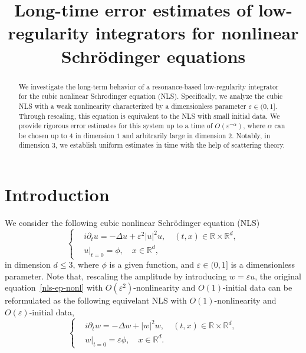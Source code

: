 \documentclass[10pt,a4paper]{article}
\title{Long-time error estimates of low-regularity integrators for nonlinear
Schr\"odinger equations}
\date{}
\begin{document}
  \maketitle
  \begin{abstract}
    We investigate the long-term behavior of a resonance-based low-regularity 
    integrator for the cubic nonlinear Schrodinger equation (NLS). Specifically, 
    we analyze the cubic NLS with a weak nonlinearity characterized by a 
    dimensionless parameter \(\varepsilon \in (0,1]\). Through rescaling, this 
    equation is equivalent to the NLS with small initial data. We provide rigorous
    error estimates for this system up to a time of \(O(\varepsilon^{-\alpha})\), 
    where \(\alpha\) can be chosen up to \(4\) in dimension \(1\) and arbitrarily 
    large in dimension \(2\). Notably, in dimension \(3\), we establish uniform 
    estimates in time with the help of scattering theory.
  \end{abstract}

  \section{Introduction}
  We consider the following cubic nonlinear Schr\"{o}dinger equation (NLS)
  \begin{equation}\label{nls-ep-nonl} %
    \left\{
    \begin{aligned}
      & i\partial_t u = -\Delta u + \varepsilon^2 |u|^2 u, \quad (t,x) \in
      \mathbb R\times\mathbb R^d, \\
      & u|_{t=0} = \phi, \quad x \in \mathbb R^d,
    \end{aligned}
    \right.
  \end{equation}
  in dimension \( d \leq 3 \), where \(\phi\) is a given function, and \(
  \varepsilon \in (0,1] \) is a dimensionless parameter. %
  Note that, rescaling the amplitude by introducing \(w = \varepsilon u\),
  the original equation~\eqref{nls-ep-nonl} with \(O(\varepsilon^2)\)-nonlinearity and 
  \(O(1)\)-initial data can be reformulated as the following equivelant NLS
  with \(O(1)\)-nonlinearity and \(O(\varepsilon)\)-initial data,
  \begin{equation}%
    \left\{
    \begin{aligned}
      & i\partial_t w = -\Delta w + |w|^2 w, \quad (t,x) \in
      \mathbb R\times\mathbb R^d, \\
      & w|_{t=0} = \varepsilon \phi, \quad x \in \mathbb R^d.
    \end{aligned}
    \right.
  \end{equation}
\end{document}
